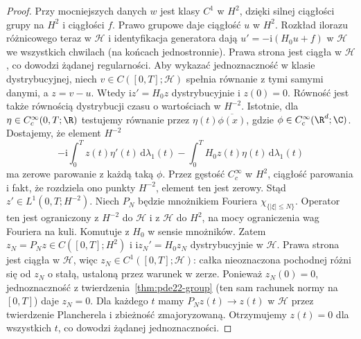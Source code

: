 \begin{proof}
Przy mocniejszych danych $w$ jest klasy $C^1$
w $H^2$, dzięki silnej ciągłości grupy na $H^2$
i ciągłości $f$. Prawo grupowe daje ciągłość
$u$ w $H^2$. Rozkład ilorazu różnicowego teraz
w $\mathcal H$ i identyfikacja generatora dają
$u'=-\mathrm i(H_0u+f)$ w $\mathcal H$ we wszystkich
chwilach (na końcach jednostronnie).
Prawa strona jest ciągła w $\mathcal H$, co
dowodzi żądanej regularności.
Aby wykazać jednoznaczność w klasie dystrybucyjnej,
niech $v\in C([0,T];\mathcal H)$ spełnia równanie
z tymi samymi danymi, a $z=v-u$. Wtedy
$\mathrm iz'=H_0z$ dystrybucyjnie i $z(0)=0$.
Równość jest także równością dystrybucji czasu
o wartościach w $H^{-2}$. Istotnie, dla
$\eta\in C_c^\infty(0,T;\R)$ testujemy równanie
przez $\eta(t)\overline{\phi(x)}$, gdzie
$\phi\in C_c^\infty(\R^d;\C)$.
Dostajemy, że element $H^{-2}$
\[
 -\mathrm i\int_0^T z(t)\eta'(t)\,\mathrm d\lambda_1(t)
 -\int_0^T H_0z(t)\eta(t)\,\mathrm d\lambda_1(t)
\]
ma zerowe parowanie z każdą taką $\phi$.
Przez gęstość $C_c^\infty$ w $H^2$, ciągłość
parowania i fakt, że rozdziela ono punkty
$H^{-2}$, element ten jest zerowy.
Stąd $z'\in L^1(0,T;H^{-2})$.
Niech $P_N$ będzie mnożnikiem Fouriera
$\chi_{\{|\xi|\le N\}}$. Operator ten jest
ograniczony z $H^{-2}$ do $\mathcal H$
i z $\mathcal H$ do $H^2$, na mocy
ograniczenia wag Fouriera na kuli.
Komutuje z $H_0$ w sensie mnożników.
Zatem $z_N=P_Nz\in C([0,T];H^2)$
i $\mathrm iz_N'=H_0z_N$ dystrybucyjnie
w $\mathcal H$. Prawa strona jest ciągła w
$\mathcal H$, więc $z_N\in C^1([0,T];\mathcal H)$:
całka nieoznaczona pochodnej różni się od $z_N$
o stałą, ustaloną przez warunek w zerze.
Ponieważ $z_N(0)=0$, jednoznaczność
z twierdzenia~\ref{thm:pde22-group} (ten sam
rachunek normy na $[0,T]$) daje $z_N=0$.
Dla każdego $t$ mamy $P_Nz(t)\to z(t)$ w $\mathcal H$
przez twierdzenie Plancherela i zbieżność
zmajoryzowaną. Otrzymujemy $z(t)=0$ dla wszystkich
$t$, co dowodzi żądanej jednoznaczności.
\end{proof}

